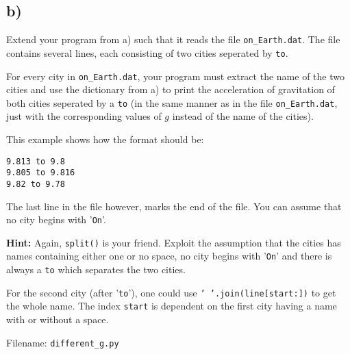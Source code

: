 \documentclass[10pt,a4paper]{article}
\begin{document}
\subsection*{b)}
Extend your program from a) such that it reads the file \texttt{on\_Earth.dat}. 
The file contains several lines, each consisting of two cities seperated by \texttt{to}. 

For every city in \texttt{on\_Earth.dat}, your program must extract the name of the two cities and use the dictionary from a) to print the acceleration of gravitation of both cities seperated by a \texttt{to}
(in the same manner as in the file \texttt{on\_Earth.dat}, just with the corresponding values of $g$ instead of the name of the cities).

This example shows how the format should be: 
\begin{verbatim}
9.813 to 9.8
9.805 to 9.816
9.82 to 9.78
\end{verbatim}

The last line in the file however, marks the end of the file. You can assume that no city begins with '\texttt{On}'. 

\textbf{Hint: } Again, \texttt{split()} is your friend. Exploit the assumption that the cities has names containing either one or no space, no city begins with '\texttt{On}' and there is always a \texttt{to} which separates the two cities. 

For the second city  (after '\texttt{to}'), one could use \texttt{' '.join(line[start:])} to get the whole name. The index \texttt{start} is dependent on the first city having a name with or without a space. 

Filename: \texttt{different\_g.py}
\end{document}
